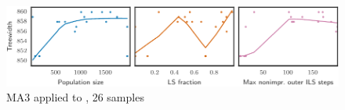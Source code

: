 \begin{figure}[h]\strictpagecheck\centering

\includegraphics[scale=0.85]{plots/MA3-correlation-regplots-latin-square-10-0-crop.pdf}


\caption[Parameter influence for MA3 when applied to ]{\gls{MA3} applied to , 26 samples}

\label{MA3-correlation-regplots-latin-square-10}

\end{figure}